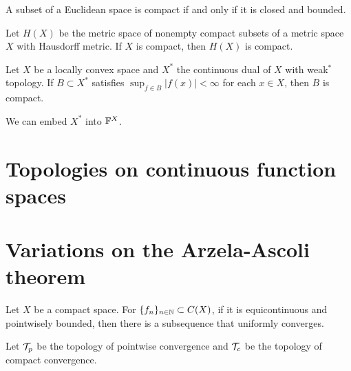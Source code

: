 \documentclass{../exp}
\begin{document}
\begin{ex}
A subset of a Euclidean space is compact if and only if it is closed and bounded.
\end{ex}
\begin{ex}
Let $H(X)$ be the metric space of nonempty compact subsets of a metric space $X$ with Hausdorff metric.
If $X$ is compact, then $H(X)$ is compact.
\end{ex}
\begin{ex}
Let $X$ be a locally convex space and $X^*$ the continuous dual of $X$ with weak$^*$ topology.
If $B\subset X^*$ satisfies $\sup_{f\in B}|f(x)|<\infty$ for each $x\in X$, then $B$ is compact.
\end{ex}
\begin{pf}
We can embed $X^*$ into $\mathbb{F}^X$.
\end{pf}








\section{Topologies on continuous function spaces}


\iffalse

$C(X,Y)$ has the compact-open topology
When $Y$ is uniform, $C(X,Y)$ has the topology of compact convergence
When $X$ is compact and $Y$ is uniform, $C(X,Y)$ has the topology of uniform convergence


When $X$ is locally compact Hausdorff, and the exponential space is endowed with compact-open topology

\fi


\section{Variations on the Arzela-Ascoli theorem}

\begin{thm}
Let $X$ be a compact space.
For $\{f_n\}_{n\in\mathbb{N}}\subset C(X)$, if it is equicontinuous and pointwisely bounded, then there is a subsequence that uniformly converges.
\end{thm}

Let $\mathcal{T}_p$ be the topology of pointwise convergence and $\mathcal{T}_c$ be the topology of compact convergence.
\end{document}
